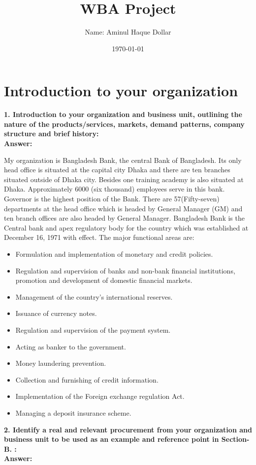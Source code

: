 \documentclass[11pt,a4paper]{article}
\title{\bf \sc WBA Project}
\date{\today}
\author{Name: Aminul Haque Dollar}
\begin{document}
	\maketitle
	\section{Introduction to your organization}
		{\bf 1. Introduction to your organization and business unit, outlining the nature of the products/services, markets, demand patterns, company structure and brief history:\\[2ex]Answer: }
		
		My organization is Bangladesh Bank, the central Bank of Bangladesh. Its only head office is situated at the capital city Dhaka and there are ten branches situated outside of Dhaka city. Besides one training academy is also situated at Dhaka. Approximately 6000 (six thousand) employees serve in this bank. Governor is the highest position of the Bank. There are 57(Fifty-seven) departments at the head office which is headed by General Manager (GM) and ten branch offices are also headed by General Manager. 
		Bangladesh Bank is the Central bank and apex regulatory body for the country which was established at December 16, 1971 with effect.
		The major functional areas are:
		
		\begin{itemize}
			\item   Formulation and implementation of monetary and credit policies.
			\item	Regulation and supervision of banks and non-bank financial institutions, promotion and development of domestic financial markets.
			\item	Management of the country's international reserves.
			\item	Issuance of currency notes.
			\item	Regulation and supervision of the payment system.
			\item	Acting as banker to the government.
			\item	Money laundering prevention.
			\item	Collection and furnishing of credit information.
			\item	Implementation of the Foreign exchange regulation Act.
			\item	Managing a deposit insurance scheme.
		\end{itemize}
	
		{\bf 2.	Identify a real and relevant procurement from your organization and business unit to be used as an example and reference point in Section-B. : \\[2ex]Answer:}
		
\end{document}
